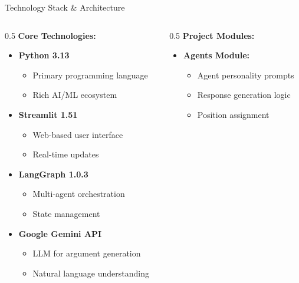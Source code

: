 \documentclass[aspectratio=169]{beamer}
\begin{document}
\begin{frame}{Technology Stack \& Architecture}
    \begin{columns}
        \begin{column}{0.5\textwidth}
            \textbf{Core Technologies:}
            \begin{itemize}
                \item \textbf{Python 3.13}
                \begin{itemize}
                    \item Primary programming language
                    \item Rich AI/ML ecosystem
                \end{itemize}
                
                \item \textbf{Streamlit 1.51}
                \begin{itemize}
                    \item Web-based user interface
                    \item Real-time updates
                \end{itemize}
                
                \item \textbf{LangGraph 1.0.3}
                \begin{itemize}
                    \item Multi-agent orchestration
                    \item State management
                \end{itemize}
                
                \item \textbf{Google Gemini API}
                \begin{itemize}
                    \item LLM for argument generation
                    \item Natural language understanding
                \end{itemize}
            \end{itemize}
        \end{column}
        
        \begin{column}{0.5\textwidth}
            \textbf{Project Modules:}
            \begin{itemize}
                \item \textbf{Agents Module:}
                \begin{itemize}
                    \item Agent personality prompts
                    \item Response generation logic
                    \item Position assignment
                \end{itemize}
                

\end{itemize}
\end{column}
\end{columns}
\end{frame}
\end{document}
